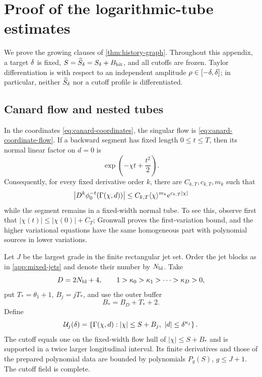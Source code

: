 \section{Proof of the logarithmic-tube estimates}
\label{app:growing-tube}

We prove the growing clauses of \cref{thm:history-graph}.  Throughout this
appendix, a target \(\delta\) is fixed,
\(S=\widehat S_\delta=S_\delta+B_{\rm hit}\), and all cutoffs are frozen.
Taylor differentiation is with respect to an independent amplitude
\(\rho\in[-\delta,\delta]\); in particular, neither \(\widehat S_\delta\) nor a
cutoff profile is differentiated.

\subsection{Canard flow and nested tubes}

In the coordinates \cref{eq:canard-coordinates}, the singular flow is
\cref{eq:canard-coordinate-flow}.  If a backward segment has fixed length
\(0\le t\le T\), then its normal linear factor on \(d=0\) is
\[
 \exp\left(-\chi t+\frac{t^2}{2}\right).
\]
Consequently, for every fixed derivative order \(k\), there are
\(C_{k,T},c_{k,T},m_k\) such that
\begin{equation}
\label{eq:fixed-flow-jet}
 \bigl|D^k\phi_0^{-t}(\Gamma(\chi,d))\bigr|
 \le C_{k,T}\langle\chi\rangle^{m_k}\mathrm e^{c_{k,T}|\chi|}
\end{equation}
while the segment remains in a fixed-width normal tube.  To see this,
observe first that \(|\chi(t)|\le|\chi(0)|+C_T\); Gronwall proves the
first-variation bound, and the higher variational equations have the same
homogeneous part with polynomial sources in lower variations.

Let \(J\) be the largest grade in the finite rectangular jet set.  Order
the jet blocks as in \cref{app:mixed-jets} and denote their number by
\(N_{\rm bl}\).  Take
\[
 D=2N_{\rm bl}+4,\qquad
 1>\kappa_0>\kappa_1>\cdots>\kappa_D>0,
\]
put \(T_*=\theta_1+1\), \(B_j=jT_*\), and use the outer buffer
\[
 B_*=B_D+T_*+2.
\]
Define
\begin{equation}
\label{eq:nested-tubes}
 \mathcal U_j(\delta)=\left\{\Gamma(\chi,d):
 |\chi|\le S+B_j,\ |d|\le\delta^{\kappa_j}\right\}.
\end{equation}
The cutoff equals one on the fixed-width flow hull of
\(|\chi|\le S+B_*\) and is supported in a twice larger longitudinal
interval.  Its finite derivatives and those of the prepared polynomial
data are bounded by polynomials \(P_g(S)\), \(g\le J+1\).  The cutoff
field is complete.

